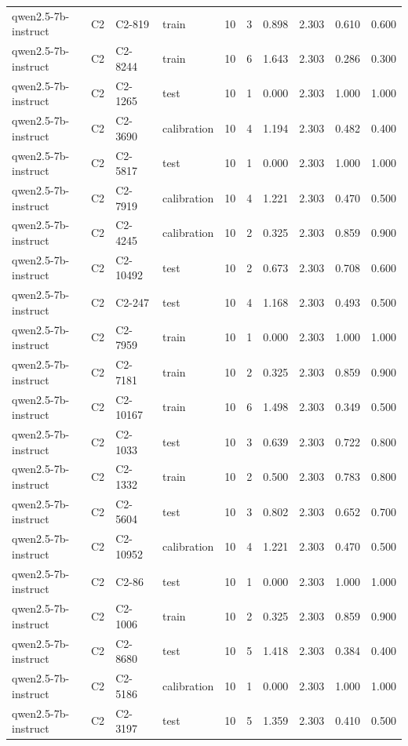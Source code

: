 \begin{table}
\begin{tabular}{llllrrrrrr}
qwen2.5-7b-instruct & C2 & C2-819 & train & 10 & 3 & 0.898 & 2.303 & 0.610 & 0.600 \\
qwen2.5-7b-instruct & C2 & C2-8244 & train & 10 & 6 & 1.643 & 2.303 & 0.286 & 0.300 \\
qwen2.5-7b-instruct & C2 & C2-1265 & test & 10 & 1 & 0.000 & 2.303 & 1.000 & 1.000 \\
qwen2.5-7b-instruct & C2 & C2-3690 & calibration & 10 & 4 & 1.194 & 2.303 & 0.482 & 0.400 \\
qwen2.5-7b-instruct & C2 & C2-5817 & test & 10 & 1 & 0.000 & 2.303 & 1.000 & 1.000 \\
qwen2.5-7b-instruct & C2 & C2-7919 & calibration & 10 & 4 & 1.221 & 2.303 & 0.470 & 0.500 \\
qwen2.5-7b-instruct & C2 & C2-4245 & calibration & 10 & 2 & 0.325 & 2.303 & 0.859 & 0.900 \\
qwen2.5-7b-instruct & C2 & C2-10492 & test & 10 & 2 & 0.673 & 2.303 & 0.708 & 0.600 \\
qwen2.5-7b-instruct & C2 & C2-247 & test & 10 & 4 & 1.168 & 2.303 & 0.493 & 0.500 \\
qwen2.5-7b-instruct & C2 & C2-7959 & train & 10 & 1 & 0.000 & 2.303 & 1.000 & 1.000 \\
qwen2.5-7b-instruct & C2 & C2-7181 & train & 10 & 2 & 0.325 & 2.303 & 0.859 & 0.900 \\
qwen2.5-7b-instruct & C2 & C2-10167 & train & 10 & 6 & 1.498 & 2.303 & 0.349 & 0.500 \\
qwen2.5-7b-instruct & C2 & C2-1033 & test & 10 & 3 & 0.639 & 2.303 & 0.722 & 0.800 \\
qwen2.5-7b-instruct & C2 & C2-1332 & train & 10 & 2 & 0.500 & 2.303 & 0.783 & 0.800 \\
qwen2.5-7b-instruct & C2 & C2-5604 & test & 10 & 3 & 0.802 & 2.303 & 0.652 & 0.700 \\
qwen2.5-7b-instruct & C2 & C2-10952 & calibration & 10 & 4 & 1.221 & 2.303 & 0.470 & 0.500 \\
qwen2.5-7b-instruct & C2 & C2-86 & test & 10 & 1 & 0.000 & 2.303 & 1.000 & 1.000 \\
qwen2.5-7b-instruct & C2 & C2-1006 & train & 10 & 2 & 0.325 & 2.303 & 0.859 & 0.900 \\
qwen2.5-7b-instruct & C2 & C2-8680 & test & 10 & 5 & 1.418 & 2.303 & 0.384 & 0.400 \\
qwen2.5-7b-instruct & C2 & C2-5186 & calibration & 10 & 1 & 0.000 & 2.303 & 1.000 & 1.000 \\
qwen2.5-7b-instruct & C2 & C2-3197 & test & 10 & 5 & 1.359 & 2.303 & 0.410 & 0.500 \\

\end{tabular}
\end{table}
